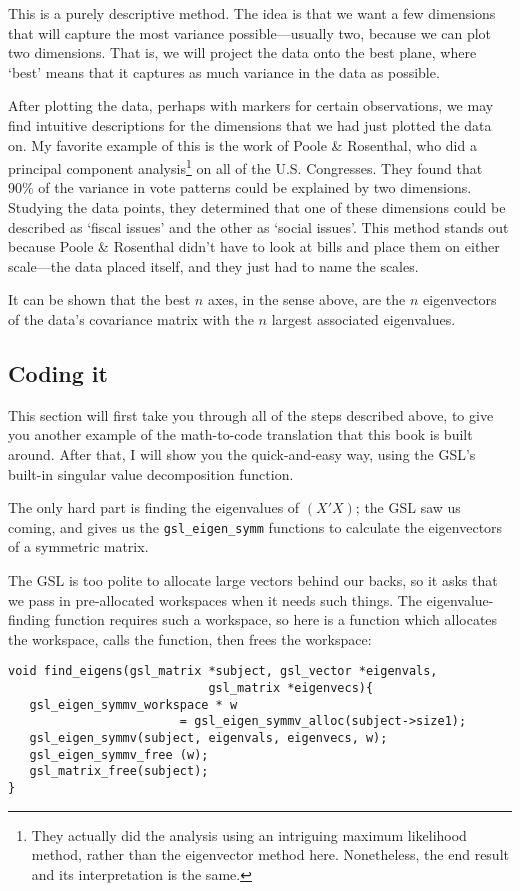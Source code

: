 This is a purely descriptive method.  The idea is that we want a few
dimensions that will capture the most variance possible---usually two,
because we can plot two dimensions. That is, we will project the data
onto the best plane, where `best' means that it captures as much
variance in the data as possible.

After plotting the data, perhaps with markers for certain observations,
we may find intuitive descriptions for the dimensions that we had just plotted the
data on. My favorite example of this is the work of Poole \& Rosenthal,
who did a principal component analysis\footnote{They actually did
the analysis using an intriguing maximum likelihood method, rather
than the eigenvector method here. Nonetheless, the end result and its
interpretation is the same.} on all of the U.S. Congresses. They found
that 90\% of the variance in vote patterns could be explained by two dimensions.
Studying the data points, they determined that one of these dimensions could be
described as `fiscal issues' and the other as `social issues'. This method stands
out because Poole \& Rosenthal didn't have to look at bills and place them on
either scale---the data placed itself, and they just had to name the scales.


It can be shown that the best $n$ axes, in the sense above, are the
$n$ eigenvectors of the data's covariance matrix with the $n$ largest
associated eigenvalues.

\subsection{Coding it}
This section will first take you through all of the steps described above, to give you another example
of the math-to-code translation that this book is built around. After that, I will show you the quick-and-easy
way, using the GSL's built-in singular value decomposition function.

The only hard part is finding the eigenvalues of
$(X'X)$; the GSL saw us coming, and gives us the {\tt gsl\_eigen\_symm} functions
to calculate the eigenvectors of a symmetric matrix.

The GSL is too polite to allocate large vectors behind our backs, so
it asks that we pass in pre-allocated workspaces when it needs such
things. The eigenvalue-finding function requires such a workspace, so
here is a function which allocates the workspace, calls the function,
then frees the workspace:
\begin{verbatim}
void find_eigens(gsl_matrix *subject, gsl_vector *eigenvals, 
                            gsl_matrix *eigenvecs){
   gsl_eigen_symmv_workspace * w 
                        = gsl_eigen_symmv_alloc(subject->size1);
   gsl_eigen_symmv(subject, eigenvals, eigenvecs, w);
   gsl_eigen_symmv_free (w);
   gsl_matrix_free(subject);
}
\end{verbatim}

